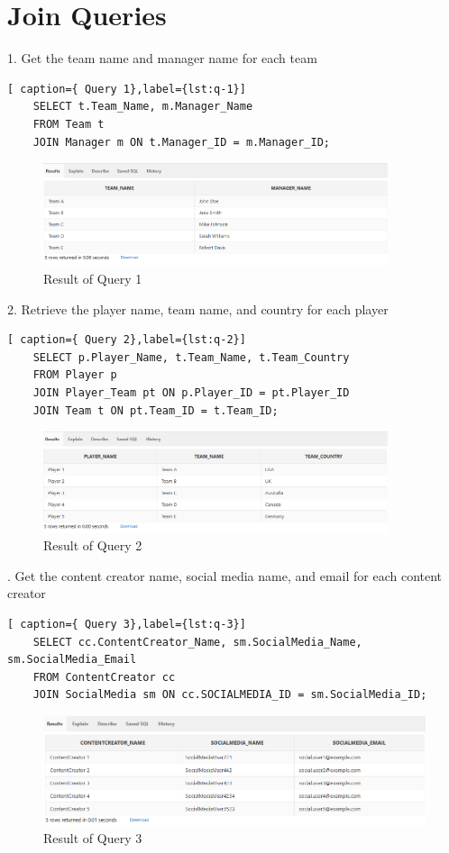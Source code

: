 \section{Join Queries}
\hrulefill

1. Get the team name and manager name for each team

\begin{lstlisting}[ caption={ Query 1},label={lst:q-1}]
    SELECT t.Team_Name, m.Manager_Name
    FROM Team t
    JOIN Manager m ON t.Manager_ID = m.Manager_ID;
\end{lstlisting}
\begin{figure}[H]
    \centering
    \includegraphics[width=0.9\textwidth]{images/dml/Joinq/q1.png}
    \caption{Result of Query 1}
\end{figure}
2. Retrieve the player name, team name, and country for each player

\begin{lstlisting}[ caption={ Query 2},label={lst:q-2}]
    SELECT p.Player_Name, t.Team_Name, t.Team_Country
    FROM Player p
    JOIN Player_Team pt ON p.Player_ID = pt.Player_ID
    JOIN Team t ON pt.Team_ID = t.Team_ID;
\end{lstlisting}
\begin{figure}[H]
    \centering
    \includegraphics[width=0.9\textwidth]{images/dml/Joinq/q2.png}
    \caption{Result of Query 2}
\end{figure}
.  Get the content creator name, social media name, and email for each content creator

\begin{lstlisting}[ caption={ Query 3},label={lst:q-3}]
    SELECT cc.ContentCreator_Name, sm.SocialMedia_Name, sm.SocialMedia_Email
    FROM ContentCreator cc
    JOIN SocialMedia sm ON cc.SOCIALMEDIA_ID = sm.SocialMedia_ID;
\end{lstlisting}
\begin{figure}[H]
    \centering
    \includegraphics[width=1\textwidth]{images/dml/Joinq/q3.png}
    \caption{Result of Query 3}
\end{figure}
\clearpage
